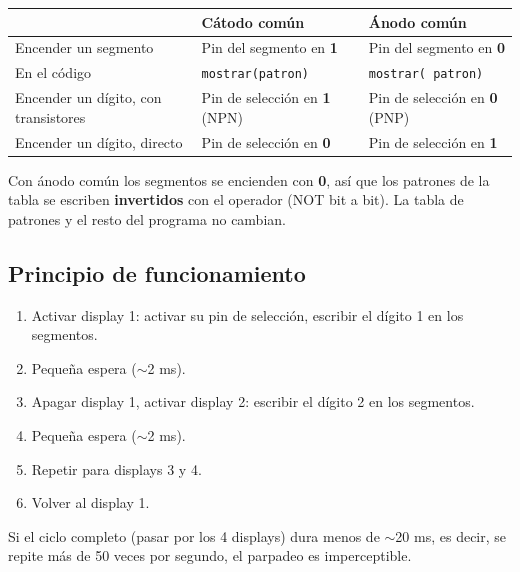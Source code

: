 \begin{table}[H]
\centering
\renewcommand{\arraystretch}{1.2}
\begin{tabularx}{\textwidth}{>{\raggedright\arraybackslash}p{3.6cm}
    >{\raggedright\arraybackslash}X >{\raggedright\arraybackslash}X}
\toprule
 & \textbf{Cátodo común} & \textbf{Ánodo común} \\
\midrule
Encender un segmento & Pin del segmento en \textbf{1} & Pin del segmento en \textbf{0} \\
En el código & \texttt{mostrar(patron)} & \texttt{mostrar(\char126 patron)} \\
Encender un dígito, con transistores & Pin de selección en \textbf{1} (NPN) & Pin de selección en \textbf{0} (PNP) \\
Encender un dígito, directo & Pin de selección en \textbf{0} & Pin de selección en \textbf{1} \\
\bottomrule
\end{tabularx}
\end{table}

\begin{notabox}
Con ánodo común los segmentos se encienden con \textbf{0}, así que los patrones de la
tabla se escriben \textbf{invertidos} con el operador \texttt{} (NOT bit a bit). La
tabla de patrones y el resto del programa no cambian.
\end{notabox}

\subsection{Principio de funcionamiento}

\begin{enumerate}
    \item Activar display 1: activar su pin de selección, escribir el dígito 1 en
          los segmentos.
    \item Pequeña espera ($\sim$2 ms).
    \item Apagar display 1, activar display 2: escribir el dígito 2 en los segmentos.
    \item Pequeña espera ($\sim$2 ms).
    \item Repetir para displays 3 y 4.
    \item Volver al display 1.
\end{enumerate}

Si el ciclo completo (pasar por los 4 displays) dura menos de $\sim$20 ms, es decir,
se repite más de 50 veces por segundo, el parpadeo es imperceptible.

